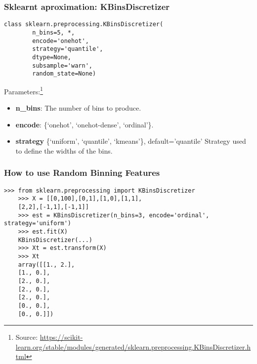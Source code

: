 \begin{frame}[fragile]
    \frametitle{Sklearnt aproximation: KBinsDiscretizer }
    
\begin{lstlisting}[style=PythonStyle]
    class sklearn.preprocessing.KBinsDiscretizer(
        n_bins=5, *, 
        encode='onehot', 
        strategy='quantile', 
        dtype=None, 
        subsample='warn',
        random_state=None)
\end{lstlisting}
Parameters:\footnote{
        Source: \url{https://scikit-learn.org/stable/modules/generated/sklearn.preprocessing.KBinsDiscretizer.html}
    }

\begin{itemize}
    \item \textbf{n\_bins}: The number of bins to produce.
    \item \textbf{encode}: \{‘onehot’, ‘onehot-dense’, ‘ordinal’\}.
    \item \textbf{strategy} \{‘uniform’, ‘quantile’, ‘kmeans’\}, default=’quantile’
    Strategy used to define the widths of the bins.
\end{itemize}
\end{frame}

\begin{frame}[fragile]
    \frametitle{How to use Random Binning Features}

\begin{lstlisting}[style=PythonStyle]
    >>> from sklearn.preprocessing import KBinsDiscretizer
    >>> X = [[0,100],[0,1],[1,0],[1,1],
    [2,2],[-1,1],[-1,1]]
    >>> est = KBinsDiscretizer(n_bins=3, encode='ordinal', strategy='uniform')
    >>> est.fit(X)
    KBinsDiscretizer(...)
    >>> Xt = est.transform(X)
    >>> Xt  
    array([[1., 2.],
    [1., 0.],
    [2., 0.],
    [2., 0.],
    [2., 0.],
    [0., 0.],
    [0., 0.]])
\end{lstlisting}

\end{frame}


